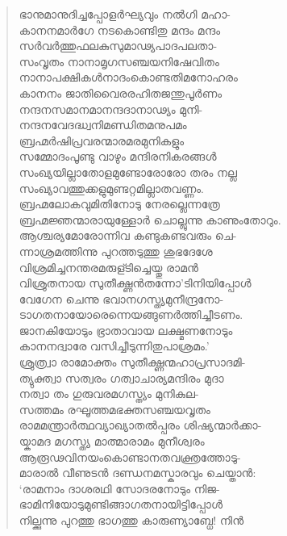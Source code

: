\begin{verse}
ഭാനുമാനുദിച്ചപ്പോളര്‍ഘ്യവും നല്‍ഗി മഹാ-\\
കാനനമാര്‍ഗേ നടകൊണ്ടിതു മന്ദം മന്ദം\\
സര്‍വര്‍ത്തുഫലകുസുമാഢ്യപാദപലതാ-\\
സംവൃതം നാനാമൃഗസഞ്ചയനിഷേവിതം\\
നാനാപക്ഷികള്‍നാദംകൊണ്ടതിമനോഹരം\\
കാനനം ജാതിവൈരരഹിതജന്തുപൂര്‍ണം\\
നന്ദനസമാനമാനന്ദദാനാഢ്യം മുനി-\\
നന്ദനവേദദ്ധ്വനിമണ്ഡിതമനുപമം\\
ബ്രഹ്മര്‍ഷിപ്രവരന്മാരമരമുനികളും\\
സമ്മോദംപൂണ്ടു വാഴും മന്ദിരനികരങ്ങള്‍\\
സംഖ്യയില്ലാതോളമുണ്ടോരോരോ തരം നല്ല\\
സംഖ്യാവത്തുക്കളുമുണ്ടറ്റമില്ലാതവണ്ണം.\\
ബ്രഹ്മലോകവുമിതിനോടു നേരല്ലെന്നത്രേ\\
ബ്രഹ്മജ്ഞന്മാരായുള്ളോര്‍ ചൊല്ലുന്നു കാണുംതോറും.\\
ആശ്ചര്യമോരോന്നിവ കണ്ടുകണ്ടവരും ചെ-\\
ന്നാശ്രമത്തിന്നു പുറത്തടുത്തു ശുഭദേശേ\\
വിശ്രമിച്ചനന്തരമരുള്ടിച്ചെയ്തു രാമന്‍\\
വിശ്രുതനായ സുതീക്ഷ്ണന്‍തന്നോ’ടിനിയിപ്പോള്‍\\
വേഗേന ചെന്നു ഭവാനഗസ്ത്യമുനീന്ദ്രനോ-\\
ടാഗതനായോരെന്നെയങ്ങുണര്‍ത്തിച്ചീടണം.\\
ജാനകിയോടും ഭ്രാതാവായ ലക്ഷ്മണനോടും\\
കാനനദ്വാരേ വസിച്ചീടുന്നിതുപാശ്രമം.’\\
ശ്രുത്ര്വാ രാമോക്തം സുതീക്ഷ്ണന്മഹാപ്രസാദമി-\\
ത്യുക്ത്വാ സത്വരം ഗത്വാചാര്യമന്ദിരം മുദാ\\
നത്വാ തം ഗുരുവരമഗസ്ത്യം മുനികുല-\\
സത്തമം രഘൂത്തമഭക്തസഞ്ചയവൃതം\\
രാമമന്ത്രാര്‍ത്ഥവ്യാഖ്യാതല്‍പ്പരം ശിഷ്യന്മാര്‍ക്കാ-\\
യ്കാമദ മഗസ്ത്യ മാത്മാരാമം മുനീശ്വരം\\
ആരൂഢവിനയംകൊണ്ടാനതവക്ത്രത്തോടു-\\
മാരാല്‍ വീണുടന്‍ ദണ്ഡനമസ്കാരവും ചെയ്താന്‍:\\
‘രാമനാം ദാശരഥി സോദരനോടും നിജ-\\
ഭാമിനിയോടുമുണ്ടിങ്ങാഗതനായിട്ടിപ്പോള്‍\\
നില്ക്കുന്നു പുറത്തു ഭാഗത്തു കാരുണ്യാബ്ധേ! നിന്‍\\

\end{verse}
